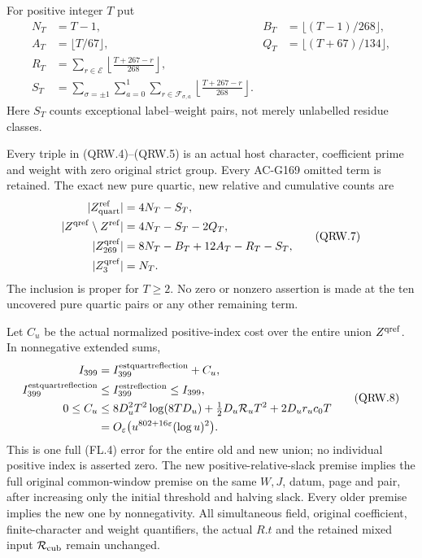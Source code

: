 For positive integer $T$ put
\[
 \begin{aligned}
 N_T&=T-1,&B_T&=\lfloor(T-1)/268\rfloor,\\
 A_T&=\lfloor T/67\rfloor,&Q_T&=\lfloor(T+67)/134\rfloor,\\
 R_T&=\sum_{r\in\mathcal E}\left\lfloor\frac{T+267-r}{268}\right\rfloor,\\
 S_T&=\sum_{\sigma=\pm1}\sum_{a=0}^1
           \sum_{r\in\mathcal F_{\sigma,a}}
                    \left\lfloor\frac{T+267-r}{268}\right\rfloor.
 \end{aligned}
 \tag{QRW.6}
\]
Here $S_T$ counts exceptional label--weight pairs, not merely
unlabelled residue classes.

\begin{theorem}
\label{AC-G171-window}
Every triple in (QRW.4)--(QRW.5) is an actual host character,
coefficient prime and weight with zero original strict group.
Every AC-G169 omitted term is retained.
The exact new pure quartic, new relative and cumulative counts are
\[
 \begin{aligned}
 |Z_{\rm quart}^{\rm ref}|&=4N_T-S_T,\\
 |Z^{\rm qref}\setminus Z^{\rm ref}|&=4N_T-S_T-2Q_T,\\
 |Z^{\rm qref}_{269}|&=8N_T-B_T+12A_T-R_T-S_T,\\
 |Z^{\rm qref}_3|&=N_T.
 \end{aligned}
 \tag{QRW.7}
\]
The inclusion is proper for $T\geq2$.
No zero or nonzero assertion is made at the ten uncovered
pure quartic pairs or any other remaining term.

Let $C_u$ be the actual normalized positive-index cost over
the entire union $Z^{\rm qref}$.  In nonnegative extended sums,
\[
 \begin{aligned}
 I_{399}&=I_{399}^{\rm estquartreflection}+C_u,\\
 I_{399}^{\rm estquartreflection}&\leq I_{399}^{\rm estreflection}\leq I_{399},\\
 0\leq C_u&\leq8D_u^2T^2\log(8TD_u)
                   +\tfrac12D_u\mathcal R_uT^2+2D_ur_uc_0T\\
 &=O_\varepsilon\bigl(u^{802+16\varepsilon}(\log u)^2\bigr).
 \end{aligned}
 \tag{QRW.8}
\]
This is one full (FL.4) error for the entire old and new union;
no individual positive index is asserted zero.
The new positive-relative-slack premise implies the full original
common-window premise on the same $W,J$, datum, page and pair,
after increasing only the initial threshold and halving slack.
Every older premise implies the new one by nonnegativity.
All simultaneous field, original coefficient, finite-character and
weight quantifiers, the actual $R.t$ and the retained mixed input
$\mathcal R_{\rm cub}$ remain unchanged.
\end{theorem}

